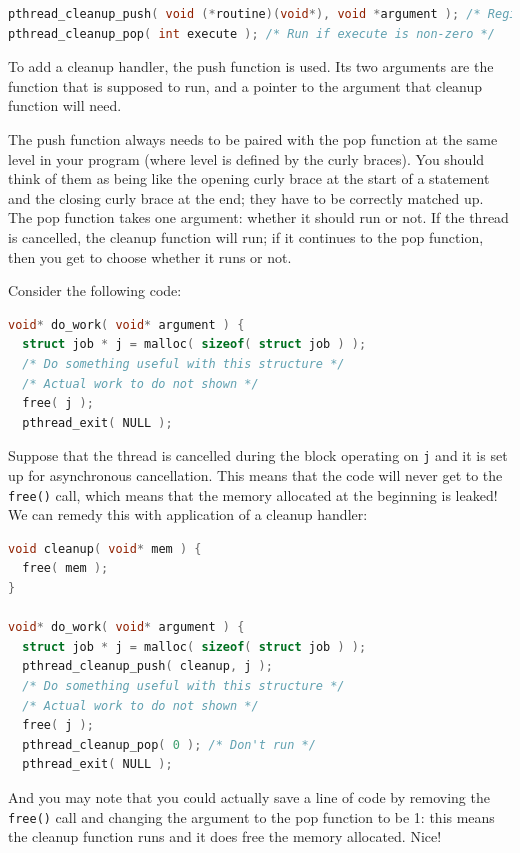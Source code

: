 \begin{lstlisting}[language=C]
pthread_cleanup_push( void (*routine)(void*), void *argument ); /* Register cleanup handler, with argument */
pthread_cleanup_pop( int execute ); /* Run if execute is non-zero */
\end{lstlisting}

To add a cleanup handler, the push function is used. Its two arguments are the function that is supposed to run, and a pointer to the argument that cleanup function will need.

The push function always needs to be paired with the pop function at the same level in your program (where level is defined by the curly braces). You should think of them as being like the opening curly brace at the start of a statement and the closing curly brace at the end; they have to be correctly matched up. The pop function takes one argument: whether it should run or not. If the thread is cancelled, the cleanup function will run; if it continues to the pop function, then you get to choose whether it runs or not.

Consider the following code:
\begin{lstlisting}[language=C]
void* do_work( void* argument ) {
  struct job * j = malloc( sizeof( struct job ) );
  /* Do something useful with this structure */
  /* Actual work to do not shown */
  free( j );
  pthread_exit( NULL );
\end{lstlisting}

Suppose that the thread is cancelled during the block operating on \texttt{j} and it is set up for asynchronous cancellation. This means that the code will never get to the \texttt{free()} call, which means that the memory allocated at the beginning is leaked! We can remedy this with application of a cleanup handler:
\begin{lstlisting}[language=C]
void cleanup( void* mem ) {
  free( mem );
}

void* do_work( void* argument ) {
  struct job * j = malloc( sizeof( struct job ) );
  pthread_cleanup_push( cleanup, j );
  /* Do something useful with this structure */
  /* Actual work to do not shown */
  free( j );
  pthread_cleanup_pop( 0 ); /* Don't run */
  pthread_exit( NULL );
\end{lstlisting}

And you may note that you could actually save a line of code by removing the \texttt{free()} call and changing the argument to the pop function to be 1: this means the cleanup function runs and it does free the memory allocated. Nice!


